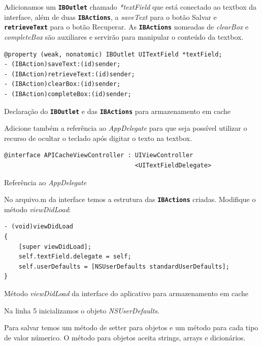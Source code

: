 \documentclass[a4paper,12pt,brazil,doubleside]{book}
\begin{document}
\begin{singlespace}
Adicionamos um \texttt{\textbf{IBOutlet}} chamado \emph{*textField} que está conectado ao textbox da interface, além de duas \texttt{\textbf{IBActions}}, a \emph{saveText} para o botão Salvar e \texttt{\textbf{retrieveText}} para o botão Recuperar.
As \texttt{\textbf{IBActions}} nomeadas de \emph{clearBox} e \emph{completeBox} são auxiliares e servirão para manipular o conteúdo da textbox.

\begin{listing}[H]
\begin{verbatim}
@property (weak, nonatomic) IBOutlet UITextField *textField;
- (IBAction)saveText:(id)sender;
- (IBAction)retrieveText:(id)sender;
- (IBAction)clearBox:(id)sender;
- (IBAction)completeBox:(id)sender;
\end{verbatim}
\caption{Declaração do \texttt{\textbf{IBOutlet}} e das \texttt{\textbf{IBActions}} para armazenamento em cache}
\end{listing}

Adicione também a referência ao \emph{AppDelegate} para que seja possível utilizar o recurso de ocultar o teclado após digitar o texto na textbox.

\begin{listing}[H]
\begin{verbatim}
@interface APICacheViewController : UIViewController 
									<UITextFieldDelegate>
\end{verbatim}
\caption{Referência ao \emph{AppDelegate}}
\end{listing}

No arquivo.m da interface temos a estrutura das \texttt{\textbf{IBActions}} criadas.
Modifique o método \emph{viewDidLoad}:

\begin{listing}[H]
\begin{verbatim}
- (void)viewDidLoad
{
    [super viewDidLoad];
    self.textField.delegate = self;
    self.userDefaults = [NSUserDefaults standardUserDefaults];
}
\end{verbatim}
\caption{Método \emph{viewDidLoad} da interface do aplicativo para armazenamento em cache}
\end{listing}

Na linha 5 inicializamos o objeto \emph{NSUserDefaults}.

Para salvar temos um método de setter para objetos e um método para cada tipo de valor númerico. O método para objetos aceita strings, arrays e dicionários.


\end{singlespace}
\end{document}
